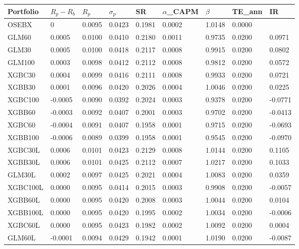 \begin{table}[H]
\centering
\footnotesize
\begin{tabularx}{\textwidth}{Xllllllll}
\toprule
Portfolio & $R_p-R_b$ & $R_p$ & $\sigma_p$    & SR & $\alpha$_{CAPM}  & $\beta$  & TE_{ann} & IR \\
\midrule
OSEBX &  0 & 0.0095 & 0.0423 & 0.1981 & 0.0002 & 1.0148 & 0.0000 &  \\ 
\midrule
GLM60 &  0.0005  & 0.0100 & 0.0410 & 0.2180 & 0.0011 & 0.9735 & 0.0200 & 0.0971 \\ 
GLM30 &  0.0005  & 0.0100 & 0.0418 & 0.2117 & 0.0008 & 0.9915 & 0.0200 & 0.0802 \\ 
GLM100 &  0.0003  & 0.0098 & 0.0412 & 0.2112 & 0.0008 & 0.9812 & 0.0200 & 0.0572 \\ 
XGBC30 &  0.0004  & 0.0099 & 0.0416 & 0.2111 & 0.0008 & 0.9933 & 0.0200 & 0.0721 \\ 
XGBB30 &  0.0001  & 0.0096 & 0.0420 & 0.2026 & 0.0004 & 1.0046 & 0.0200 & 0.0225 \\ 
XGBC100 &  -0.0005  & 0.0090 & 0.0392 & 0.2024 & 0.0003 & 0.9378 & 0.0200 & -0.0771 \\ 
XGBB60 &  -0.0003  & 0.0092 & 0.0407 & 0.2001 & 0.0003 & 0.9702 & 0.0200 & -0.0413 \\ 
XGBC60 &  -0.0004  & 0.0091 & 0.0407 & 0.1958 & 0.0001 & 0.9715 & 0.0200 & -0.0693 \\ 
XGBB100 &  -0.0006  & 0.0089 & 0.0399 & 0.1958 & 0.0001 & 0.9545 & 0.0200 & -0.0970 \\
\midrule
XGBC30L &  0.0006  & 0.0101 & 0.0423 & 0.2129 & 0.0008 & 1.0144 & 0.0200 & 0.1105 \\ 
XGBB30L &  0.0006  & 0.0101 & 0.0425 & 0.2112 & 0.0007 & 1.0217 & 0.0200 & 0.1033 \\ 
GLM30L &  0.0002  & 0.0097 & 0.0425 & 0.2021 & 0.0004 & 1.0083 & 0.0200 & 0.0359 \\ 
XGBC100L &  0.0000  & 0.0095 & 0.0414 & 0.2015 & 0.0003 & 0.9908 & 0.0200 & -0.0057 \\ 
XGBB60L &  0.0000  & 0.0095 & 0.0420 & 0.2008 & 0.0003 & 1.0044 & 0.0200 & 0.0104 \\ 
XGBB100L &  0.0000  & 0.0095 & 0.0420 & 0.1995 & 0.0002 & 1.0034 & 0.0200 & -0.0006 \\ 
XGBC60L &  0.0000  & 0.0095 & 0.0423 & 0.1982 & 0.0002 & 1.0092 & 0.0200 & 0.0004 \\ 
GLM60L &  -0.0001  & 0.0094 & 0.0429 & 0.1942 & 0.0001 & 1.0190 & 0.0200 & -0.0087 \\ 

\end{tabularx}
\end{table}

